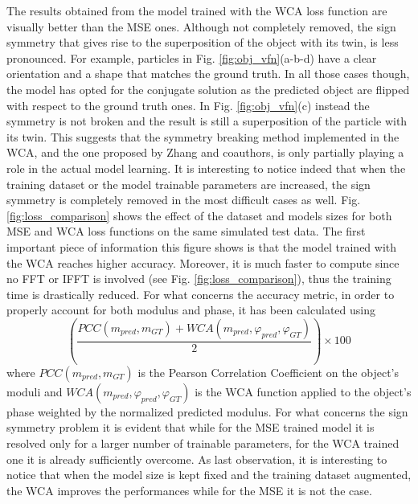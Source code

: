 The results obtained from the model trained with the WCA loss function are visually better than the MSE ones. Although not 
completely removed, the sign symmetry that gives rise to the superposition of the object with its twin, is less pronounced. 
For example, particles in Fig. \ref{fig:obj_vfn}(a-b-d) have a clear orientation and a shape that matches the ground truth. 
In all those cases though, the model has opted for the conjugate solution as the predicted object are flipped with respect to 
the ground truth ones. In Fig. \ref{fig:obj_vfn}(c) instead the symmetry is not broken and the result is still a superposition 
of the particle with its twin. This suggests that the symmetry breaking method implemented in the WCA, and the one proposed by 
Zhang and coauthors, is only partially playing a role in the actual model learning. It is interesting to notice indeed that 
when the training dataset or the model trainable parameters are increased, the sign symmetry is completely removed in the most 
difficult cases as well. Fig. \ref{fig:loss_comparison} shows the effect of the dataset and models sizes for both MSE and WCA 
loss functions on the same simulated test data. The first important piece of information this figure shows is that the model trained 
with the WCA reaches higher accuracy. Moreover, it is much faster to compute since no FFT or IFFT is involved (see Fig. \ref{fig:loss_comparison}), 
thus the training time is drastically reduced. For what concerns the accuracy metric, in order to properly account for 
both modulus and phase, it has been calculated using 
\begin{equation}
 \left(\frac{PCC(m_{pred}, m_{GT}) + WCA(m_{pred},\varphi_{pred},\varphi_{GT} )}{2}\right)\times 100
 \label{eq:accuracy_phasing}
\end{equation}
where $PCC(m_{pred}, m_{GT})$ is the Pearson Correlation Coefficient on the object's moduli and $WCA(m_{pred},\varphi_{pred},\varphi_{GT} )$ is the WCA function 
applied to the object's phase weighted by the normalized predicted modulus. For what concerns the sign symmetry problem it is evident that while for 
the MSE trained model it is resolved only for a larger number of trainable parameters, for the WCA trained one it is already 
sufficiently overcome. As last observation, it is interesting to notice that when the model size is kept fixed and the training 
dataset augmented, the WCA improves the performances while for the MSE it is not the case. 

